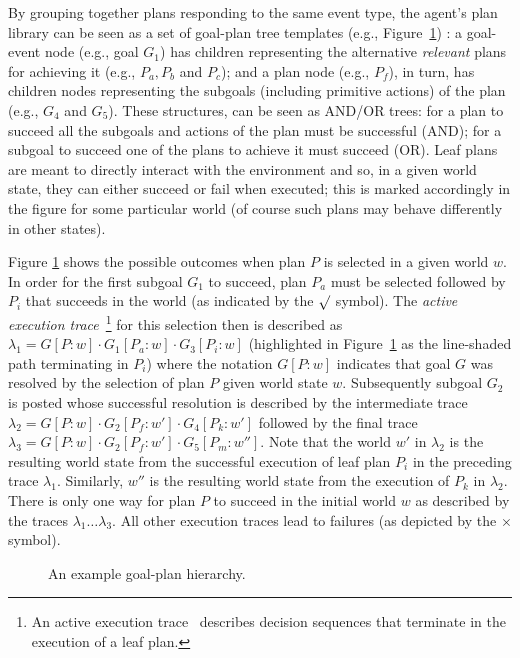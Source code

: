By grouping together plans responding to the same event type, the agent's plan library can be seen as a set of goal-plan tree templates (e.g., Figure~\ref{fig:confidence}) \cite{ShawBordini:AAMAS08}: a goal-event node (e.g., goal $G_1$) has children representing the alternative \emph{relevant} plans for achieving it (e.g., $P_a,P_b$ and $P_c$); and a plan node (e.g., $P_f$), in turn, has children nodes representing the subgoals (including primitive actions) of the plan (e.g., $G_4$ and $G_5$). These structures, can be seen as AND/OR trees: for a plan to succeed all the subgoals and actions of the plan must be successful (AND); for a subgoal to succeed one of the plans to achieve it must succeed (OR). Leaf plans are meant to directly interact with the environment and so, in a given world state, they can either succeed or fail when executed; this is marked accordingly in the figure for some particular world (of course such plans may behave differently in other states).


Figure \ref{fig:confidence} shows the possible outcomes when plan $P$ is selected in a given world $w$. In order for the first subgoal $G_1$ to succeed, plan $P_a$ must be selected followed by $P_i$ that succeeds in the world (as indicated by the $\surd$ symbol). The {\em active execution trace}~\footnote{An active execution trace~\cite{singh10:learning} describes decision sequences that terminate in the execution of a leaf plan.} for this selection then is described as $\lambda_1=G[P:w] \cdot G_1[P_a:w] \cdot G_3[P_i:w]$ (highlighted in Figure~\ref{fig:confidence} as the line-shaded path terminating in $P_i$) where the notation $G[P:w]$ indicates that goal $G$ was resolved by the selection of plan $P$ given world state $w$. Subsequently subgoal $G_2$ is posted whose successful resolution is described by the intermediate trace $\lambda_2=G[P:w] \cdot G_2[P_f:w'] \cdot G_4[P_k:w']$ followed by the final trace $\lambda_3=G[P:w] \cdot G_2[P_f:w'] \cdot G_5[P_m:w'']$. Note that the world $w'$ in $\lambda_2$ is the resulting world state from the successful execution of leaf plan $P_i$ in the preceding trace $\lambda_1$. Similarly, $w''$ is the resulting world state from the execution of $P_k$ in $\lambda_2$. There is only one way for plan $P$ to succeed in the initial world $w$ as described by the traces $\lambda_1 \ldots \lambda_3$. All other execution traces lead to failures (as depicted by the $\times$ symbol).

\begin{figure}[t]
\begin{center}
\resizebox{0.9\columnwidth}{!}{

}
\end{center}
\vskip -0.5cm
\caption{An example goal-plan hierarchy.}
\label{fig:confidence}
\end{figure}


